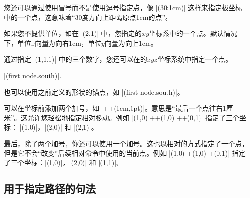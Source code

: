 您还可以通过使用冒号而不是使用逗号指定点，像 |(30:1cm)| 这样来指定极坐标中的一个点，这意味着``30度方向上距离原点1cm的点''。


如果您不提供单位，如在 |(2,1)| 中，您指定\pgfname 的$xy$坐标系中的一个点。默认情况下，单位$x$向量为向右1cm，单位$y$向量为向上1cm。


通过指定 |(1,1,1)| 中的三个数字，您还可以在\pgfname 的$xyz$坐标系统中指定一个点。

|(first node.south)|.

也可以使用之前定义的形状的锚点，如 |(first node.south)|。


可以在坐标前添加两个加号，如 |++(1cm,0pt)|。意思是``最后一个点往右1厘米''。这允许您轻松地指定相对移动。例如 |(1,0) ++(1,0) ++(0,1)| 指定了三个坐标： |(1,0)|，|(2,0)| 和 |(2,1)|。%


最后，除了两个加号，你还可以使用一个加号。这也以相对的方式指定了一个点，但是它不会``改变''后续相对命令中使用的当前点。例如 |(1,0) +(1,0) +(0,1)| 指定了三个坐标：|(1,0)|，|(2,0)| 和 |(1,1)|。


\subsection{用于指定路径的句法}

